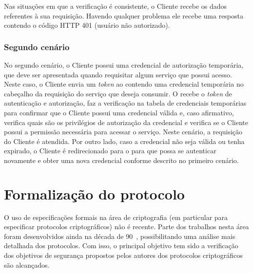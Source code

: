 Nas situa\c c\~{o}es em que a verifica\c c\~{a}o \'{e} consistente,
o Cliente recebe os dados referentes à sua requisição.
Havendo qualquer problema ele recebe uma resposta contendo o c\'{o}digo HTTP 401 (usuário não autorizado).


\subsubsection{Segundo cenário}

No segundo cenário, o Cliente possui uma credencial de autorização temporária,
que deve ser apresentada quando requisitar algum serviço que possui acesso.
Neste caso, o Cliente envia um \emph{token} ao \servidorRest{} contendo uma credencial temporária no cabeçalho da requisição do serviço que deseja
consumir. O \servidorRest recebe o \emph{token} de autenticação e autorização, faz a verificação na tabela de credenciais temporárias
para confirmar que o Cliente possui uma credencial válida e, caso afirmativo, verifica quais são os privilégios de
autorização da credencial e verifica se o Cliente possui a permissão necess\'{a}ria para acessar o serviço. Neste cen\'{a}rio,
a requisi\c c\~{a}o do Cliente é atendida. Por outro lado,
caso a credencial não seja válida ou tenha expirado, o Cliente é redirecionado para o \servidorAA{}
para que possa se autenticar novamente e obter uma nova credencial conforme descrito
no primeiro cenário. %



\section{Formalização do protocolo}

O uso de especifica\c c\~{o}es formais na área de criptografia (em particular para especificar protocolos criptogr\'{a}ficos)
não é recente. Parte dos trabalhos nesta área foram desenvolvidos ainda na década de 90~\cite{Meadows95},
possibilitando uma análise mais detalhada dos protocolos. Com isso, o principal objetivo
tem sido a verifica\c c\~{a}o dos objetivos de seguran\c ca propostos
pelos autores dos protocolos criptogr\'{a}ficos são alcançados.

